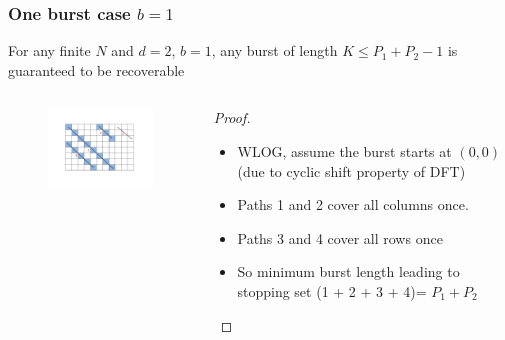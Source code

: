\documentclass[10pt,xcolor=table]{beamer}
\begin{document}
	\begin{frame}\frametitle{One burst case $b=1$}
		
		\begin{theorem}
			\color{blue} For any finite $N$ and $d=2$, $b=1$, any burst of length $K \leq P_1+P_2-1$ is guaranteed to be recoverable
			
			\begin{columns}
				
				\begin{figure}[t]
					\centering
					\includegraphics[width=1.9in]{./Figures/1burstmatrix}
				\end{figure}
				
				\begin{proof}
					\begin{itemize}
						
						
						\item WLOG, assume the burst starts at $(0,0)$ (due to cyclic shift property of DFT)
						\item Paths \alert{1} and \alert{2} cover all columns once.
						\item Paths \alert{3} and \alert{4} cover all rows once
						\item So minimum burst length leading to stopping set (\alert{1 + 2 + 3 + 4})= $P_1 + P_2$
					\end{itemize}
					
				\end{proof}
			\end{columns}
		\end{theorem}
	\end{frame}
	
	
\end{document}
